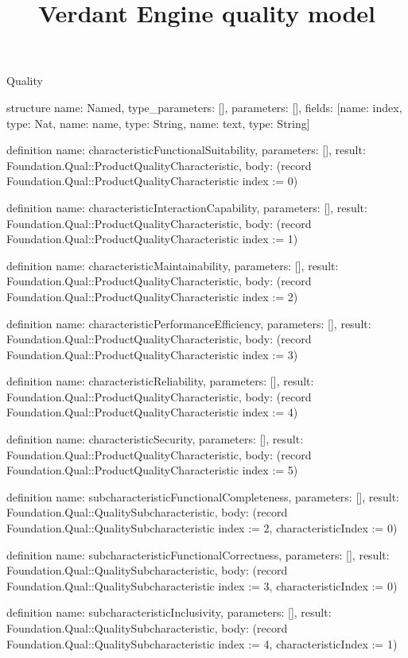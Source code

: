 \begin{lexlean}{Quality}
\title{Verdant Engine quality model}
\begin{semanticmodule}
structure{
  name: Named,
  type_parameters: [],
  parameters: [],
  fields: [{name: index, type: Nat}, {name: name, type: String}, {name: text, type: String}]
}

definition{
  name: characteristicFunctionalSuitability,
  parameters: [],
  result: Foundation.Qual::ProductQualityCharacteristic,
  body: (record Foundation.Qual::ProductQualityCharacteristic {index := 0})
}

definition{
  name: characteristicInteractionCapability,
  parameters: [],
  result: Foundation.Qual::ProductQualityCharacteristic,
  body: (record Foundation.Qual::ProductQualityCharacteristic {index := 1})
}

definition{
  name: characteristicMaintainability,
  parameters: [],
  result: Foundation.Qual::ProductQualityCharacteristic,
  body: (record Foundation.Qual::ProductQualityCharacteristic {index := 2})
}

definition{
  name: characteristicPerformanceEfficiency,
  parameters: [],
  result: Foundation.Qual::ProductQualityCharacteristic,
  body: (record Foundation.Qual::ProductQualityCharacteristic {index := 3})
}

definition{
  name: characteristicReliability,
  parameters: [],
  result: Foundation.Qual::ProductQualityCharacteristic,
  body: (record Foundation.Qual::ProductQualityCharacteristic {index := 4})
}

definition{
  name: characteristicSecurity,
  parameters: [],
  result: Foundation.Qual::ProductQualityCharacteristic,
  body: (record Foundation.Qual::ProductQualityCharacteristic {index := 5})
}

definition{
  name: subcharacteristicFunctionalCompleteness,
  parameters: [],
  result: Foundation.Qual::QualitySubcharacteristic,
  body: (record Foundation.Qual::QualitySubcharacteristic {index := 2, characteristicIndex := 0})
}

definition{
  name: subcharacteristicFunctionalCorrectness,
  parameters: [],
  result: Foundation.Qual::QualitySubcharacteristic,
  body: (record Foundation.Qual::QualitySubcharacteristic {index := 3, characteristicIndex := 0})
}

definition{
  name: subcharacteristicInclusivity,
  parameters: [],
  result: Foundation.Qual::QualitySubcharacteristic,
  body: (record Foundation.Qual::QualitySubcharacteristic {index := 4, characteristicIndex := 1})
}


\end{semanticmodule}
\end{lexlean}

